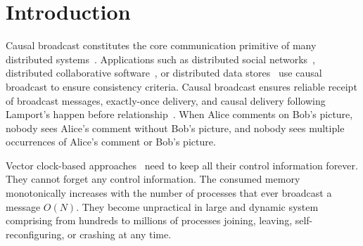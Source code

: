  
\section{Introduction}

Causal broadcast constitutes the core communication primitive of many
distributed systems~\cite{hadzilacos1994modular}. Applications such as
distributed social networks~\cite{borthakur2013petabyte}, distributed
collaborative software~\cite{heinrich2012exploiting,nedelec2016crate}, or
distributed data
stores~\cite{bailis2013bolton,bravo2017saturn,demers1987epidemic,lloyd2011cops,shapiro2011comprehensive}
use causal broadcast to ensure consistency criteria.  Causal broadcast ensures
reliable receipt of broadcast messages, exactly-once delivery, and causal
delivery following Lamport's happen before
relationship~\cite{lamport1978time}. When Alice comments on Bob's picture,
nobody sees Alice's comment without Bob's picture, and nobody sees multiple
occurrences of Alice's comment or Bob's picture.

Vector clock-based
approaches~\cite{malkhi2007concise,mukund2014optimized,nedelec2018pcbroadcast}
need to keep all their control information forever. They cannot forget any
control information.  The consumed memory monotonically increases with the
number of processes that ever broadcast a message $O(N)$.  They become
unpractical in large and dynamic system comprising from hundreds to millions of
processes joining, leaving, self-reconfiguring, or crashing at any time.

